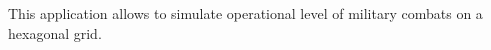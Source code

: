 \label{index_md_README}%
%
 This application allows to simulate operational level of military combats on a hexagonal grid. 